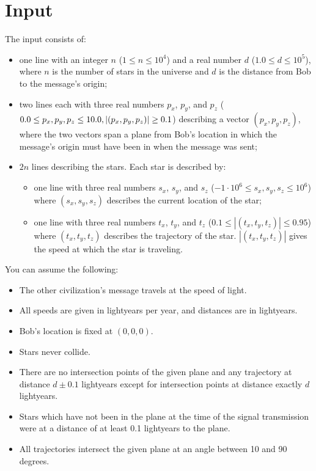 \section*{Input}

The input consists of:
\begin{itemize}
\item one line with an integer $n$ ($1 \leq n \leq 10^4$) and a real number $d$ ($1.0 \leq d \leq 10^5$), where $n$ is the number of stars in the universe and $d$ is the distance from Bob to the message's origin;
\item two lines each with three real numbers $p_x$, $p_y$, and $p_z$ ($0.0 \leq p_x, p_y, p_z \leq 10.0,\\|(p_x, p_y, p_z)| \geq 0.1$) describing a vector $(p_x, p_y, p_z)$, where the two vectors span a plane from Bob's location in which the message's origin must have been in when the message was sent;
\item $2n$ lines describing the stars. Each star is described by:
\begin{itemize}
\item one line with three real numbers $s_x$, $s_y$, and $s_z$ ($-1\cdot 10^6 \leq s_x, s_y, s_z \leq 10^6$) where $(s_x, s_y, s_z)$ describes the current location of the star;
\item one line with three real numbers $t_x$, $t_y$, and $t_z$ ($0.1 \leq |(t_x, t_y, t_z)| \leq 0.95$) where $(t_x, t_y, t_z)$ describes the trajectory of the star. $|(t_x, t_y, t_z)|$ gives the speed at which the star is traveling.
\end{itemize}
\end{itemize}

You can assume the following:
\begin{itemize}
\item The other civilization's message travels at the speed of light.
\item All speeds are given in lightyears per year, and distances are in lightyears.
\item Bob's location is fixed at $(0, 0, 0)$.
\item Stars never collide.
\item There are no intersection points of the given plane and any trajectory at distance $d \pm 0.1$ lightyears except for intersection points at distance exactly $d$ lightyears.
\item Stars which have not been in the plane at the time of the signal transmission were at a distance of at least 0.1 lightyears to the plane.
\item All trajectories intersect the given plane at an angle between 10 and 90 degrees.
\end{itemize}

